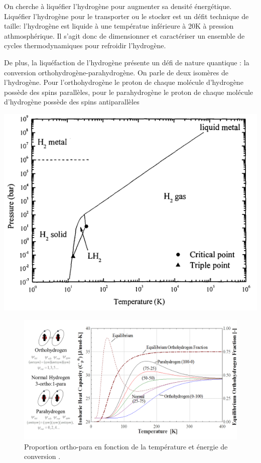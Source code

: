 \documentclass[11pt,french,a4paper]{article}
\begin{document}
\begin{multicols}{2}
On cherche à liquéfier l'hydrogène pour augmenter sa densité énergétique. Liquéfier l'hydrogène pour le transporter ou le stocker est un défit technique de taille: l'hydrogène est liquide à une températue inférieure à 20K à pression athmosphérique. Il s'agit donc de dimensionner et caractériser un ensemble de cycles thermodynamiques pour refroidir l'hydrogène. 

De plus, la liquéfaction de l'hydrogène présente un défi de nature quantique : la conversion orthohydrogène-parahydrogène. On parle de deux isomères de l'hydrogène. Pour l'orthohydrogène le proton de chaque molécule d'hydrogène possède des spins parallèles, pour le parahydrogène le proton de chaque molécule d'hydrogène possède des spins antiparallèles


 \begin{center}
  \includegraphics[width=\linewidth]{image/chap3/diagramme de phase H2.png}
\end{center}

\end{multicols}

\begin{figure}[!h]
\centering
  \includegraphics[width=0.6\linewidth]{image/chap3/Ortho-para.png}
 \caption{Proportion ortho-para en fonction de la température et énergie de conversion \cite{orthopara}.}
\end{figure}
\end{document}
